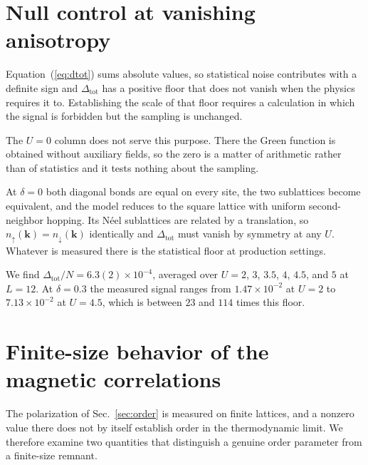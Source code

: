 \documentclass[aps,prb,reprint,superscriptaddress,amsmath,amssymb,floatfix]{revtex4-2}
\begin{document}
\section{Null control at vanishing anisotropy}

Equation~(\ref{eq:dtot}) sums absolute values, so statistical noise contributes
with a definite sign and $\Delta_{\mathrm{tot}}$ has a positive floor that does
not vanish when the physics requires it to. Establishing the scale of that floor
requires a calculation in which the signal is forbidden but the sampling is
unchanged.

The $U = 0$ column does not serve this purpose. There the Green function is
obtained without auxiliary fields, so the zero is a matter of arithmetic rather
than of statistics and it tests nothing about the sampling.

At $\delta = 0$ both diagonal bonds are equal on every site, the two sublattices
become equivalent, and the model reduces to the square lattice with uniform
second-neighbor hopping. Its N\'eel sublattices are related by a translation, so
$n_{\uparrow}(\bm{k}) = n_{\downarrow}(\bm{k})$ identically and
$\Delta_{\mathrm{tot}}$ must vanish by symmetry at any $U$. Whatever is measured
there is the statistical floor at production settings.

We find $\Delta_{\mathrm{tot}}/N = 6.3(2)\times10^{-4}$, averaged over
$U = 2$, $3$, $3.5$, $4$, $4.5$, and $5$ at $L = 12$.
At $\delta = 0.3$ the measured signal ranges from $1.47\times10^{-2}$ at
$U = 2$ to $7.13\times10^{-2}$ at $U = 4.5$, which is between $23$ and $114$
times this floor.

\section{Finite-size behavior of the magnetic correlations}
\label{sec:fss}

The polarization of Sec.~\ref{sec:order} is measured on finite lattices, and a
nonzero value there does not by itself establish order in the thermodynamic
limit. We therefore examine two quantities that distinguish a genuine order
parameter from a finite-size remnant.
\end{document}
